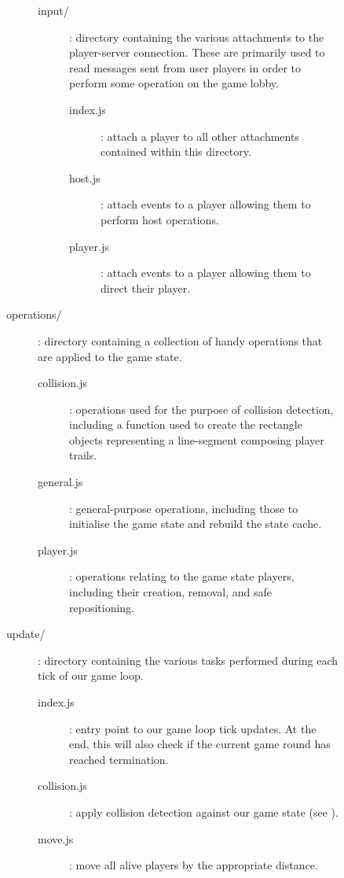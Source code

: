 \documentclass{standalone}
\begin{document}
\begin{formal}
\begin{description}
\begin{description}
\begin{description}
\begin{description}
			      			\item[input/]: directory containing the various attachments to the player-server connection. These are primarily used to read messages sent from user players in order to perform some operation on the game lobby.
					      	\begin{description}
				      			\item[index.js]: attach a player to all other attachments contained within this directory.
				      			\item[host.js]: attach events to a player allowing them to perform host operations.
				      			\item[player.js]: attach events to a player allowing them to direct their player.
				      		\end{description}
			      		\end{description}

			      		\item[operations/]: directory containing a collection of handy operations that are applied to the game state.
				      	\begin{description}
			      			\item[collision.js]: operations used for the purpose of collision detection, including a function used to create the rectangle objects representing a line-segment composing player trails.
			      			\item[general.js]: general-purpose operations, including those to initialise the game state and rebuild the state cache.
			      			\item[player.js]: operations relating to the game state players, including their creation, removal, and safe repositioning.
			      		\end{description}

			      		\item[update/]: directory containing the various tasks performed during each tick of our game loop.
				      	\begin{description}
			      			\item[index.js]: entry point to our game loop tick updates. At the end, this will also check if the current game round has reached termination.
			      			\item[collision.js]: apply collision detection against our game state (see ). 
			      			\item[move.js]: move all alive players by the appropriate distance.
			      		\end{description}


\end{description}
\end{description}
\end{description}
\end{formal}
\end{document}
